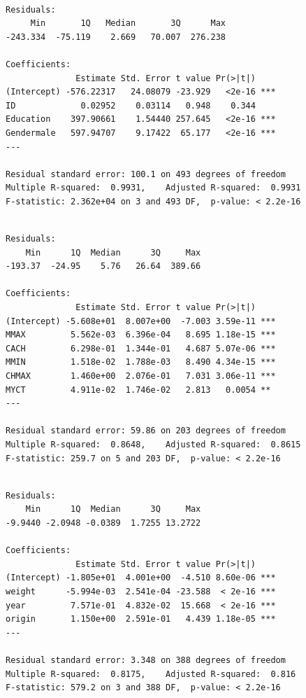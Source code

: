 \documentclass{paper}
\begin{document}
\begin{minipage}{\linewidth}
  \begin{lstlisting}[caption={Summary of multiple regression fit for exercise 1},
    label=list:res1]

Residuals:
     Min       1Q   Median       3Q      Max
-243.334  -75.119    2.669   70.007  276.238

Coefficients:
              Estimate Std. Error t value Pr(>|t|)
(Intercept) -576.22317   24.08079 -23.929   <2e-16 ***
ID             0.02952    0.03114   0.948    0.344
Education    397.90661    1.54440 257.645   <2e-16 ***
Gendermale   597.94707    9.17422  65.177   <2e-16 ***
---

Residual standard error: 100.1 on 493 degrees of freedom
Multiple R-squared:  0.9931,	Adjusted R-squared:  0.9931
F-statistic: 2.362e+04 on 3 and 493 DF,  p-value: < 2.2e-16

  \end{lstlisting}
\end{minipage}


\begin{minipage}{\linewidth}
  \begin{lstlisting}[caption={Summary of multiple regression fit for exercise 2},
    label=list:res2]

Residuals:
    Min      1Q  Median      3Q     Max
-193.37  -24.95    5.76   26.64  389.66

Coefficients:
              Estimate Std. Error t value Pr(>|t|)
(Intercept) -5.608e+01  8.007e+00  -7.003 3.59e-11 ***
MMAX         5.562e-03  6.396e-04   8.695 1.18e-15 ***
CACH         6.298e-01  1.344e-01   4.687 5.07e-06 ***
MMIN         1.518e-02  1.788e-03   8.490 4.34e-15 ***
CHMAX        1.460e+00  2.076e-01   7.031 3.06e-11 ***
MYCT         4.911e-02  1.746e-02   2.813   0.0054 **
---

Residual standard error: 59.86 on 203 degrees of freedom
Multiple R-squared:  0.8648,	Adjusted R-squared:  0.8615
F-statistic: 259.7 on 5 and 203 DF,  p-value: < 2.2e-16

  \end{lstlisting}
\end{minipage}


\begin{minipage}{\linewidth}
  \begin{lstlisting}[caption={Summary of multiple regression fit for exercise 4},
    label=list:res3]

Residuals:
    Min      1Q  Median      3Q     Max
-9.9440 -2.0948 -0.0389  1.7255 13.2722

Coefficients:
              Estimate Std. Error t value Pr(>|t|)
(Intercept) -1.805e+01  4.001e+00  -4.510 8.60e-06 ***
weight      -5.994e-03  2.541e-04 -23.588  < 2e-16 ***
year         7.571e-01  4.832e-02  15.668  < 2e-16 ***
origin       1.150e+00  2.591e-01   4.439 1.18e-05 ***
---

Residual standard error: 3.348 on 388 degrees of freedom
Multiple R-squared:  0.8175,	Adjusted R-squared:  0.816
F-statistic: 579.2 on 3 and 388 DF,  p-value: < 2.2e-16

  \end{lstlisting}
\end{minipage}
\end{document}
